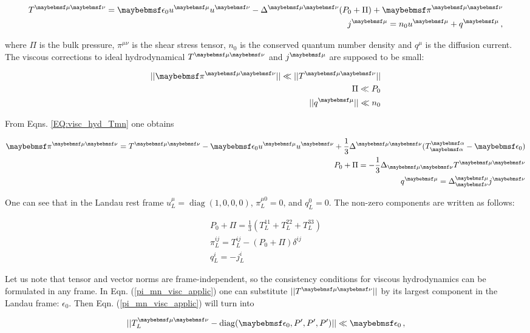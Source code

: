 \begin{align}  \label{EQ:visc_hyd_Tmn}
  \Tmn = \epsilon_0 u^{\mu} u^{\nu} - \Delta^{\mu \nu} (P_0 + \Pi) + \pi^{\mu \nu} \\
  \jmu = n_0 u^{\mu} + q^{\mu} \,, \nonumber
\end{align}

where $\Pi$ is the bulk pressure, $\pi^{\mu \nu}$ is the shear stress tensor,
$n_0$ is the conserved quantum number density and $q^{\mu}$ is the diffusion
current. The viscous corrections to ideal hydrodynamical $\Tmn$ and $\jmu$ are
supposed to be small:

\begin{align}
\label{pi_mn_visc_applic}
  ||\pi^{\mu \nu}|| \ll ||\Tmn|| \\
  \Pi \ll P_0 \\
  ||q^{\mu}|| \ll n_0
\end{align}

From Eqns. \ref{EQ:visc_hyd_Tmn} one obtains

\begin{align}
  \pi^{\mu \nu} = T^{\mu \nu} - \epsilon_0 u^{\mu} u^{\nu} + \frac{1}{3} \Delta^{\mu \nu} (T^{\alpha}_{\alpha} -\epsilon_0) \\
  P_0 + \Pi = - \frac{1}{3} \Delta_{\mu \nu} \Tmn \\
  q^{\mu} = \Delta^{\mu}_{\nu} j^{\nu}
\end{align}

One can see that in the Landau rest frame $u_L^{\mu} = \operatorname{diag}(1,0,0,0)$,
$\pi_L^{\mu 0} = 0$, and $q_L^{0} = 0$. The non-zero components are written as follows:

\begin{align}
  P_0 + \Pi = \frac{1}{3} (T_L^{11} + T_L^{22} + T_L^{33}) \\
  \pi^{i j}_L = T^{i j}_L - (P_0 + \Pi)\delta^{ij} \\
  q_L^{i} = -j_L^i
\end{align}

Let us note that tensor and vector norms are frame-independent, so the
consistency conditions for viscous hydrodynamics can be formulated in any frame.
In Eqn. (\ref{pi_mn_visc_applic}) one can substitute $||\Tmn||$ by its largest
component in the Landau frame: $\epsilon_0$. Then Eqn. (\ref{pi_mn_visc_applic})
will turn into

\begin{align}
  ||\Tmn_L - \operatorname{diag}(\epsilon_0, P', P', P') || \ll \epsilon_0 \,,
\end{align}

